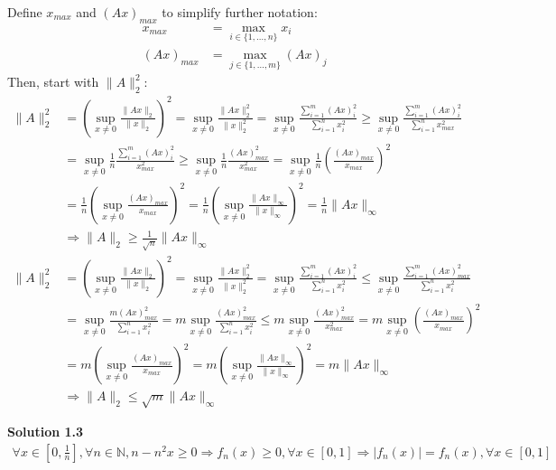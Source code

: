 \documentclass[a4paper,10.5pt]{article}
\newcommand{\N}{\mathbb{N}}
\newcommand{\supx}{\sup_{x\neq0}}
\begin{document}
Define $x_{max}$ and $\left(Ax\right)_{max}$ to simplify further notation:
\begin{align*}
	x_{max} &= \max_{i\in\{1,\dots,n\}} x_i \\
	\left(Ax\right)_{max} &= \max_{j\in\{1,\dots,m\}}\left(Ax\right)_j
\end{align*}
Then, start with $\|A\|_2^2$:
\begin{align*}
\|A\|_2^2&=\left(\supx\frac{\|Ax\|_2}{\|x\|_2}\right)^2=\supx\frac{\|Ax\|_2^2}{\|x\|_2^2} = \supx \frac{\sum_{i=1}^{m} \left(Ax\right)_i^2}{\sum_{i=1}^{n} x_i^2} \geq \supx \frac{\sum_{i=1}^{m} \left(Ax\right)_i^2}{\sum_{i=1}^{n} x_{max}^2} \\
&=\supx \frac{1}{n}\frac{\sum_{i=1}^{m} \left(Ax\right)_i^2}{x_{max}^2} \geq \supx \frac{1}{n}\frac{\left(Ax\right)_{max}^2}{x_{max}^2} = \supx \frac{1}{n} \left(\frac{\left(Ax\right)_{max}}{x_{max}}\right)^2 \\
&= \frac{1}{n}  \left(\supx\frac{\left(Ax\right)_{max}}{x_{max}}\right)^2 =\frac{1}{n} \left(\supx \frac{\|Ax\|_\infty}{\|x\|_\infty}\right)^2= \frac{1}{n}\|Ax\|_\infty \\
&\Rightarrow \|A\|_2 \geq \frac{1}{\sqrt{n}}\|Ax\|_\infty
\end{align*}
\begin{align*}
\|A\|_2^2&=\left(\supx\frac{\|Ax\|_2}{\|x\|_2}\right)^2=\supx\frac{\|Ax\|_2^2}{\|x\|_2^2} = \supx \frac{\sum_{i=1}^{m} \left(Ax\right)_{i}^2}{\sum_{i=1}^{n} x_i^2} \leq \supx \frac{\sum_{i=1}^{m} \left(Ax\right)_{max}^2}{\sum_{i=1}^{n} x_{i}^2} \\&= \supx \frac{m \left(Ax\right)_{max}^2}{\sum_{i=1}^{n} x_{i}^2} = m\supx \frac{\left(Ax\right)_{max}^2}{\sum_{i=1}^{n} x_{i}^2} \leq m\supx \frac{\left(Ax\right)_{max}^2}{x_{max}^2} = m\supx \left(\frac{\left(Ax\right)_{max}}{x_{max}}\right)^2 \\
&=m\left(\supx \frac{\left(Ax\right)_{max}}{x_{max}}\right)^2 = m\left(\supx \frac{\|Ax\|_\infty}{\|x\|_\infty}\right)^2 = m\|Ax\|_\infty \\
&\Rightarrow \|A\|_2 \leq \sqrt{m}\|Ax\|_\infty
\end{align*}

\clearpage

\noindent \textbf {Solution 1.3} \\
\begin{align*}
\forall x \in \left[0,\frac{1}{n}\right], \forall n \in \N, n - n^2 x \geq 0 \Rightarrow f_n (x) \geq 0, \forall x \in [0,1] \Rightarrow \lvert f_n(x) \rvert = f_n(x), \forall x \in [0,1] \\
\end{align*}
\end{document}
